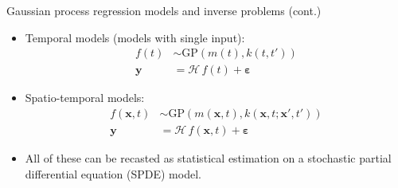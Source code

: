 \documentclass[first=dgreen,second=purple,presentation]{elecslides}
\begin{document}
\begin{frame}{Gaussian process regression models and inverse problems (cont.)}

 \begin{itemize}[<+->]
 \item \alert{Temporal} models (models with single input):
\begin{equation}
\begin{split}
  f(t) &\sim \mathrm{GP}(m(t),k(t,t')) \\
  \mathbf{y} &= \boldsymbol{\mathcal{H}} \, f(t) + \boldsymbol{\varepsilon} %
\end{split}
\nonumber
\end{equation}
 
\item \alert{Spatio-temporal} models:
\begin{equation}
\begin{split}
  f(\mathbf{x},t) &\sim \mathrm{GP}(m(\mathbf{x},t),k(\mathbf{x},t;\mathbf{x}',t')) \\
  \mathbf{y} &= \boldsymbol{\mathcal{H}} \, f(\mathbf{x},t) + \boldsymbol{\varepsilon} %
\end{split}
\nonumber
\end{equation}

\item All of these can be recasted as \alert{statistical estimation on a stochastic partial differential equation (SPDE) model}.

\end{itemize}
\end{frame}
\end{document}
